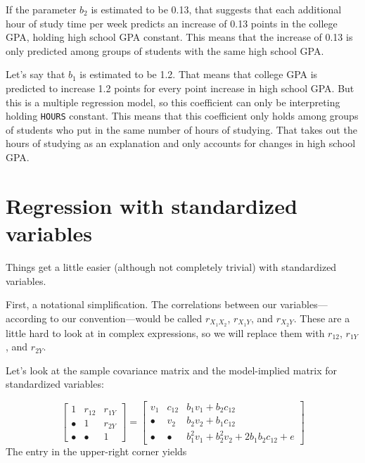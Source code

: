 \documentclass[
]{book}
\begin{document}
If the parameter \(b_{2}\) is estimated to be 0.13, that suggests that each additional hour of study time per week predicts an increase of 0.13 points in the college GPA, holding high school GPA constant. This means that the increase of 0.13 is only predicted among groups of students with the same high school GPA.

Let's say that \(b_{1}\) is estimated to be 1.2. That means that college GPA is predicted to increase 1.2 points for every point increase in high school GPA. But this is a multiple regression model, so this coefficient can only be interpreting holding \texttt{HOURS} constant. This means that this coefficient only holds among groups of students who put in the same number of hours of studying. That takes out the hours of studying as an explanation and only accounts for changes in high school GPA.

\hypertarget{multiple-standardized}{%
\section{Regression with standardized variables}\label{multiple-standardized}}

Things get a little easier (although not completely trivial) with standardized variables.

First, a notational simplification. The correlations between our variables---according to our convention---would be called \(r_{X_{1}X_{2}}\), \(r_{X_{1}Y}\), and \(r_{X_{2}Y}\). These are a little hard to look at in complex expressions, so we will replace them with \(r_{12}\), \(r_{1Y}\), and \(r_{2Y}\).

Let's look at the sample covariance matrix and the model-implied matrix for standardized variables:

\[
\begin{bmatrix}
1           &   r_{12}      &   r_{1Y} \\
\bullet     &   1           &   r_{2Y} \\
\bullet     &   \bullet     &   1
\end{bmatrix} = 
\begin{bmatrix}
v_{1}   &    c_{12}  &   b_{1} v_{1} + b_{2} c_{12} \\
\bullet &    v_{2}   &   b_{2} v_{2} + b_{1} c_{12} \\
\bullet &    \bullet &   b_{1}^{2} v_{1} + b_{2}^{2} v_{2} + 2b_{1}b_{2} c_{12} + e
\end{bmatrix}
\]
The entry in the upper-right corner yields
\end{document}
